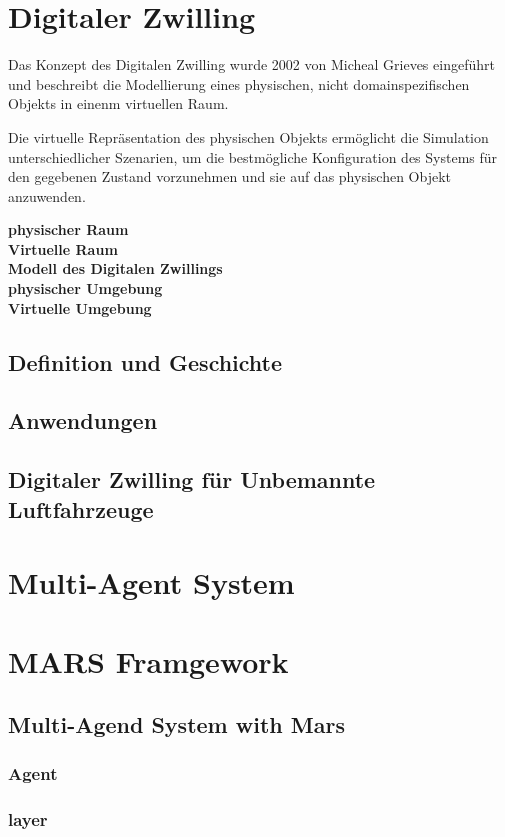 \section{Digitaler Zwilling}

    Das Konzept des Digitalen Zwilling wurde 2002 von Micheal Grieves eingeführt und beschreibt die Modellierung eines physischen, nicht domainspezifischen Objekts in einenm virtuellen Raum.  

    Die virtuelle Repräsentation des physischen Objekts ermöglicht die Simulation unterschiedlicher Szenarien, um die bestmögliche Konfiguration des Systems für den gegebenen Zustand vorzunehmen und sie auf das physischen Objekt anzuwenden. 

    \textbf{physischer Raum} \\

    \textbf{Virtuelle Raum} \\

    \textbf{Modell des Digitalen Zwillings} \\

    \textbf{physischer Umgebung} \\

    \textbf{Virtuelle Umgebung} \\

    \subsection{Definition und Geschichte}

    \subsection{Anwendungen}

    \subsection{Digitaler Zwilling für Unbemannte Luftfahrzeuge}

\section{Multi-Agent System}

\section{MARS Framgework}

    \subsection{Multi-Agend System with Mars}

    \subsubsection{Agent}

    \subsubsection{layer}



